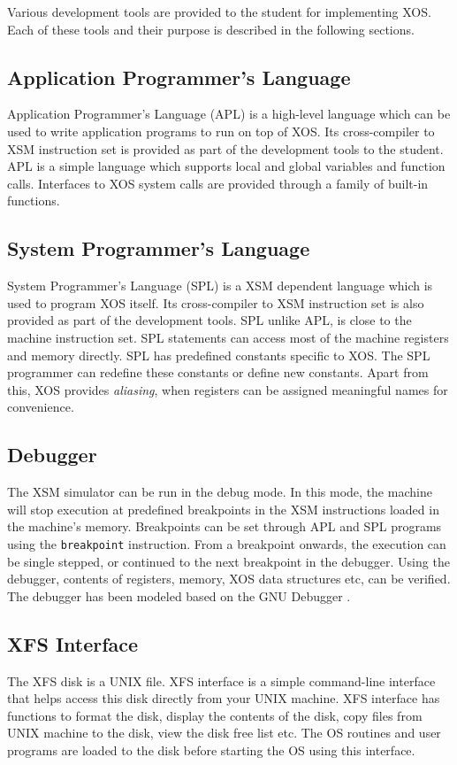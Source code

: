 \documentclass{sig-alternate}
\begin{document}
Various development tools are provided to the student for implementing XOS. Each of these tools and their purpose is described in the following sections. 

\subsection{Application Programmer's Language}
Application Programmer's Language (APL) is a high-level language which can be used to write application programs to run on top of XOS. Its cross-compiler to XSM instruction set is provided as part of the development tools to the student. APL is a simple language which supports local and global variables and function calls. Interfaces to XOS system calls are provided through a family of built-in functions. \\


\subsection{System Programmer's Language}
System Programmer's Language (SPL) is a XSM dependent language which is used to program XOS itself. Its cross-compiler to XSM instruction set is also provided as part of the development tools. SPL unlike APL, is close to the machine instruction set. SPL statements can access most of the machine registers and memory directly. SPL has predefined constants specific to XOS. The SPL programmer can redefine these constants or define new constants. Apart from this, XOS provides \textit{aliasing}, when registers can be assigned meaningful names for convenience.\\


\subsection{Debugger}
The XSM simulator can be run in the debug mode. In this mode, the machine will stop execution at predefined breakpoints in the XSM instructions loaded in the machine's memory. Breakpoints can be set through APL and SPL programs using the \texttt{breakpoint} instruction. From a breakpoint onwards, the execution can be single stepped, or continued to the next breakpoint in the debugger. Using the debugger, contents of registers, memory, XOS data structures etc, can be verified. The debugger has been modeled based on the GNU Debugger \cite{gdb}.\\


\subsection{XFS Interface}
The XFS disk is a UNIX file. XFS interface is a simple command-line interface that helps access this disk directly from your UNIX machine. XFS interface has functions to format the disk, display the contents of the disk, copy files from UNIX machine to the disk, view the disk free list etc. The OS routines and user programs are loaded to the disk before starting the OS using this interface.
\end{document}
